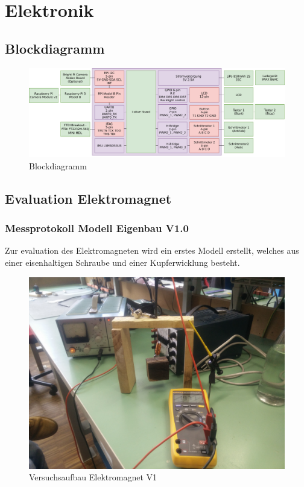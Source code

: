 \documentclass[a4paper]{report}
\begin{document}
\section{Elektronik}
\subsection{Blockdiagramm}
\begin{figure}[h!]
  \includegraphics[keepaspectratio,width=\textwidth]{BlockdiagrammElektronik}
  \caption{Blockdiagramm}
  \label{fig:ElektronikBlockdiagramm}
\end{figure}
\newpage
\subsection{Evaluation Elektromagnet}
\subsubsection{Messprotokoll Modell Eigenbau V1.0}
Zur evaluation des Elektromagneten wird ein erstes Modell erstellt, welches aus einer eisenhaltigen Schraube und einer Kupferwicklung besteht.
\begin{figure}[h!]
	\includegraphics[keepaspectratio,width=\textwidth]{Versuchsaufbau_Elektromagnet_v1}
	\caption{Versuchsaufbau Elektromagnet V1}
	\label{fig:VersuchsaufbauElektromagnet}
\end{figure}
\end{document}
